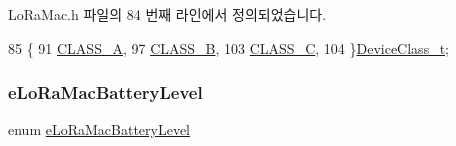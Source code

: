 Lo\+Ra\+Mac.\+h 파일의 84 번째 라인에서 정의되었습니다.


\begin{DoxyCode}
85 \{
91     \mbox{\hyperlink{group___l_o_r_a_m_a_c_gga133e92597739340bac439d1b0916dcb6a307ee33f71385819abc142fe4f23c3bb}{CLASS\_A}},
97     \mbox{\hyperlink{group___l_o_r_a_m_a_c_gga133e92597739340bac439d1b0916dcb6a10611f4c3b970c7d722c98eaea63ddd5}{CLASS\_B}},
103     \mbox{\hyperlink{group___l_o_r_a_m_a_c_gga133e92597739340bac439d1b0916dcb6abfee35359a39adbacbc3f13eddc76cd0}{CLASS\_C}},
104 \}\mbox{\hyperlink{group___l_o_r_a_m_a_c_ga29dc2e097802faaf8fbd0e18ff99695f}{DeviceClass\_t}};
\end{DoxyCode}
\mbox{\label{group___l_o_r_a_m_a_c_gac7cbd1d9dc906cf2b33e3715cdd426c3}} 
\subsubsection{\texorpdfstring{e\+Lo\+Ra\+Mac\+Battery\+Level}{eLoRaMacBatteryLevel}}
{\footnotesize\ttfamily enum \mbox{\hyperlink{group___l_o_r_a_m_a_c_gac7cbd1d9dc906cf2b33e3715cdd426c3}{e\+Lo\+Ra\+Mac\+Battery\+Level}}}

